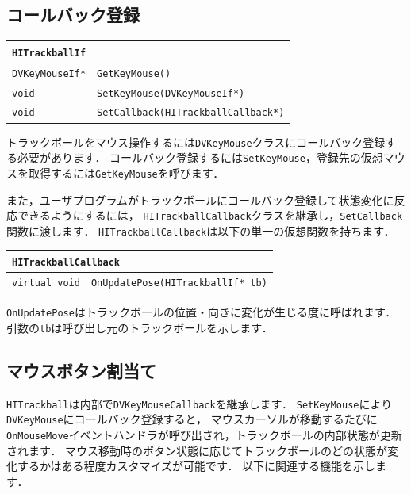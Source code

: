 \subsection*{コールバック登録}

\begin{center}
\begin{tabular}{p{.2\hsize}p{.7\hsize}}
\multicolumn{2}{l}{\texttt{HITrackballIf}}								\\ \midrule
\texttt{DVKeyMouseIf*} 	& \texttt{GetKeyMouse()}						\\
\texttt{void} 			& \texttt{SetKeyMouse(DVKeyMouseIf*)}			\\
\texttt{void} 			& \texttt{SetCallback(HITrackballCallback*)}	\\
\end{tabular}
\end{center}

\KLUDGE トラックボールをマウス操作するには\texttt{DVKeyMouse}クラスにコールバック登録する必要があります．
\KLUDGE コールバック登録するには\texttt{SetKeyMouse}，登録先の仮想マウスを取得するには\texttt{GetKeyMouse}を呼びます．

\KLUDGE また，ユーザプログラムがトラックボールにコールバック登録して状態変化に反応できるようにするには，
\texttt{HITrackballCallback}クラスを継承し，\texttt{SetCallback}関数に渡します．
\texttt{HITrackballCallback}は以下の単一の仮想関数を持ちます．
\begin{center}
\begin{tabular}{p{.2\hsize}p{.7\hsize}}
\multicolumn{2}{l}{\texttt{HITrackballCallback}}					\\ \midrule
\texttt{virtual void} 	& \texttt{OnUpdatePose(HITrackballIf* tb)}	\\
\end{tabular}
\end{center}
\texttt{OnUpdatePose}はトラックボールの位置・向きに変化が生じる度に呼ばれます．
\KLUDGE 引数の\texttt{tb}は呼び出し元のトラックボールを示します．

\subsection*{マウスボタン割当て}

\texttt{HITrackball}は内部で\texttt{DVKeyMouseCallback}を継承します．
\texttt{SetKeyMouse}により\texttt{DVKeyMouse}にコールバック登録すると，
\KLUDGE マウスカーソルが移動するたびに\texttt{OnMouseMove}イベントハンドラが呼び出され，トラックボールの内部状態が更新されます．
\KLUDGE マウス移動時のボタン状態に応じてトラックボールのどの状態が変化するかはある程度カスタマイズが可能です．
\KLUDGE 以下に関連する機能を示します．


